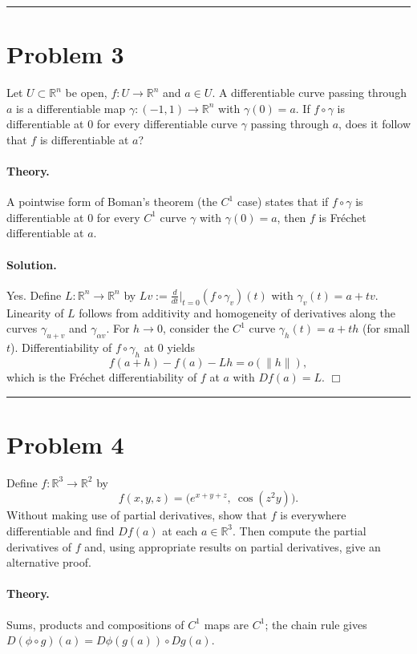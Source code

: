 \documentclass[12pt,a4paper]{article}
\theoremstyle{plain}
\theoremstyle{definition}
\theoremstyle{remark}
\theoremstyle{remark}
\begin{document}
\bigskip\hrule\bigskip

\section*{Problem 3}
Let $U\subset\mathbb{R}^n$ be open, $f:U\to\mathbb{R}^n$ and $a\in U$.
A differentiable curve passing through $a$ is a differentiable map
$\gamma:(-1,1)\to\mathbb{R}^n$ with $\gamma(0)=a$.
If $f\circ\gamma$ is differentiable at $0$ for every differentiable curve $\gamma$ passing through $a$,
does it follow that $f$ is differentiable at $a$?

\paragraph{Theory.}
A pointwise form of Boman's theorem (the $C^1$ case) states that if $f\circ\gamma$ is differentiable
at $0$ for every $C^1$ curve $\gamma$ with $\gamma(0)=a$, then $f$ is Fr\'echet differentiable at $a$.

\paragraph{Solution.}
Yes. Define $L:\mathbb{R}^n\to\mathbb{R}^n$ by $Lv:=\frac{d}{dt}\big|_{t=0}(f\circ\gamma_v)(t)$ with
$\gamma_v(t)=a+tv$. Linearity of $L$ follows from additivity and homogeneity of derivatives along
the curves $\gamma_{u+v}$ and $\gamma_{\alpha v}$.
For $h\to0$, consider the $C^1$ curve $\gamma_h(t)=a+th$ (for small $t$). Differentiability of
$f\circ\gamma_h$ at $0$ yields
\[
f(a+h)-f(a)-Lh=o(\|h\|),
\]
which is the Fr\'echet differentiability of $f$ at $a$ with $Df(a)=L$.
\hfill$\Box$

\bigskip\hrule\bigskip

\section*{Problem 4}
Define $f:\mathbb{R}^3\to\mathbb{R}^2$ by
\[
f(x,y,z)=\big(e^{x+y+z},\ \cos(z^2y)\big).
\]
Without making use of partial derivatives, show that $f$ is everywhere differentiable and find $Df(a)$ at each $a\in\mathbb{R}^3$.
Then compute the partial derivatives of $f$ and, using appropriate results on partial derivatives, give an alternative proof.

\paragraph{Theory.}
Sums, products and compositions of $C^1$ maps are $C^1$; the chain rule gives
$D(\phi\circ g)(a)=D\phi(g(a))\circ Dg(a)$.
\end{document}
